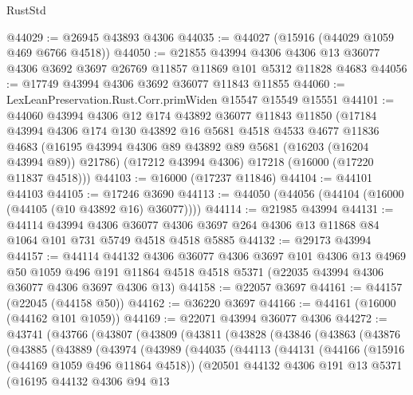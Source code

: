 \begin{lexlean}{RustStd}
\begin{coremodule}
@44029 := @26945 @43893 @4306
@44035 := @44027 (@15916 (@44029 @1059 @469 @6766 @4518))
@44050 := @21855
    @43994
    @4306
    @4306
    @13
    @36077
    @4306
    @3692
    @3697
    @26769
    @11857
    @11869
    @101
    @5312
    @11828
    @4683
@44056 := @17749 @43994 @4306 @3692 @36077 @11843 @11855
@44060 := LexLeanPreservation.Rust.Corr.primWiden @15547 @15549 @15551
@44101 := @44060
    @43994
    @4306
    @12
    @174
    @43892
    @36077
    @11843
    @11850
    (@17184
      @43994
      @4306
      @174
      @130
      @43892
      @16
      @5681
      @4518
      @4533
      @4677
      @11836
      @4683
      (@16195 @43994 @4306 @89 @43892 @89 @5681 (@16203 (@16204 @43994 @89)) @21786)
      (@17212 @43994 @4306)
      @17218
      (@16000 (@17220 @11837 @4518)))
@44103 := @16000 (@17237 @11846)
@44104 := @44101 @44103
@44105 := @17246 @3690
@44113 := @44050 (@44056 (@44104 (@16000 (@44105 (@10 @43892 @16) @36077))))
@44114 := @21985 @43994
@44131 := @44114
    @43994
    @4306
    @36077
    @4306
    @3697
    @264
    @4306
    @13
    @11868
    @84
    @1064
    @101
    @731
    @5749
    @4518
    @4518
    @5885
@44132 := @29173 @43994
@44157 := @44114
    @44132
    @4306
    @36077
    @4306
    @3697
    @101
    @4306
    @13
    @4969
    @50
    @1059
    @496
    @191
    @11864
    @4518
    @4518
    @5371
    (@22035 @43994 @4306 @36077 @4306 @3697 @4306 @13)
@44158 := @22057 @3697
@44161 := @44157 (@22045 (@44158 @50))
@44162 := @36220 @3697
@44166 := @44161 (@16000 (@44162 @101 @1059))
@44169 := @22071 @43994 @36077 @4306
@44272 := @43741
    (@43766
      (@43807
        (@43809
          (@43811
            (@43828
              (@43846
                (@43863
                  (@43876
                    (@43885
                      (@43889
                        (@43974
                          (@43989
                            (@44035
                              (@44113
                                (@44131
                                  (@44166
                                    (@15916 (@44169 @1059 @496 @11864 @4518))
                                    (@20501
                                      @44132
                                      @4306
                                      @191
                                      @13
                                      @5371
                                      (@16195
                                        @44132
                                        @4306
                                        @94
                                        @13

\end{coremodule}
\end{lexlean}

